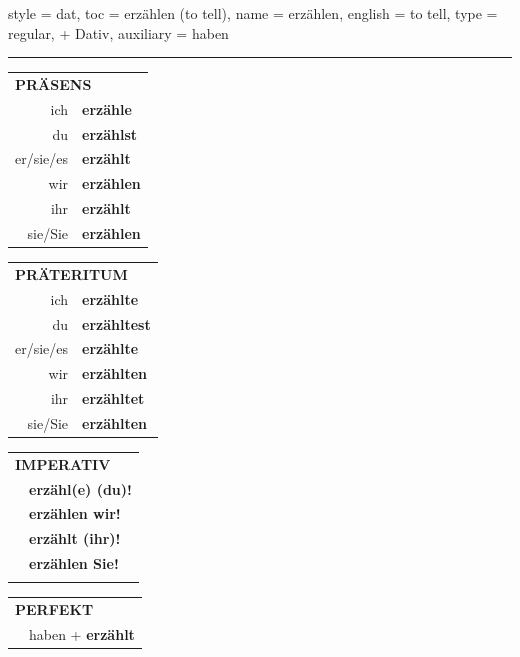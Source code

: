 \begin{verbentry}{
  style = {dat},
  toc = {erzählen (to tell)},
  name = {erzählen},
  english = {to tell},
  type = {regular, + Dativ},
  auxiliary = {haben}
}
 
    
     \vspace{5pt}

    \hrule
    
    \vspace{5pt}

  \begin{tabular}{rl}
     \multicolumn{2}{l}{\textbf{PRÄSENS} }\\
    ich & \textbf{erzähle}\\
    du & \textbf{erzählst}\\
    er/sie/es & \textbf{erzählt}\\
    wir & \textbf{erzählen}\\
    ihr & \textbf{erzählt}\\
    sie/Sie & \textbf{erzählen}\\
  \end{tabular}
  \hfill
     \begin{tabular}{rl}
    \multicolumn{2}{l}{\textbf{PRÄTERITUM} }\\
    ich & \textbf{erzählte}\\
    du & \textbf{erzähltest}\\
    er/sie/es & \textbf{erzählte}\\
    wir & \textbf{erzählten}\\
    ihr & \textbf{erzähltet}\\
    sie/Sie & \textbf{erzählten}\\
  \end{tabular}
  \hfill
  \begin{tabular}{rl}
     \multicolumn{2}{l}{\textbf{IMPERATIV} }\\
   & \textbf{erzähl(e) (du)!}\\
   & \textbf{erzählen wir!}\\
   & \textbf{erzählt (ihr)!}\\
   & \textbf{erzählen Sie!}\\
   & \vspace{10pt}
  \end{tabular}

    \vspace{10pt}

 \begin{tabular}{rl}
     \multicolumn{2}{l}{\textbf{PERFEKT}}\\
  &  haben + \textbf{erzählt}\\
  \end{tabular}
\hfill
   \begin{tabular}{rl}
   

\end{tabular}
\end{verbentry}
